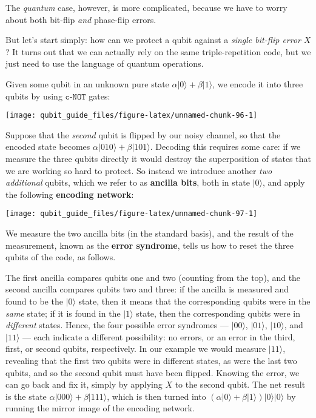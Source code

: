 \documentclass[fleqn]{article}
\begin{document}
The \emph{quantum} case, however, is more complicated, because we have to worry about both bit-flip \emph{and} phase-flip errors.

But let's start simply: how can we protect a qubit against a \emph{single bit-flip error} \(X\)?
It turns out that we can actually rely on the same triple-repetition code, but we just need to use the language of quantum operations.

Given some qubit in an unknown pure state \(\alpha|0\rangle + \beta|1\rangle\), we encode it into three qubits by using \(\texttt{c-NOT}\) gates:

\begin{center}\texttt{[image: qubit\_guide\_files/figure-latex/unnamed-chunk-96-1]} \end{center}

Suppose that the \emph{second} qubit is flipped by our noisy channel, so that the encoded state becomes \(\alpha|010\rangle + \beta|101\rangle\).
Decoding this requires some care: if we measure the three qubits directly it would destroy the superposition of states that we are working so hard to protect.
So instead we introduce another \emph{two additional} qubits, which we refer to as \textbf{ancilla bits}, both in state \(|0\rangle\), and apply the following \textbf{encoding network}:

\begin{center}\texttt{[image: qubit\_guide\_files/figure-latex/unnamed-chunk-97-1]} \end{center}

We measure the two ancilla bits (in the standard basis), and the result of the measurement, known as the \textbf{error syndrome}, tells us how to reset the three qubits of the code, as follows.

The first ancilla compares qubits one and two (counting from the top), and the second ancilla compares qubits two and three: if the ancilla is measured and found to be the \(|0\rangle\) state, then it means that the corresponding qubits were in the \emph{same} state; if it is found in the \(|1\rangle\) state, then the corresponding qubits were in \emph{different} states.
Hence, the four possible error syndromes --- \(|00\rangle\), \(|01\rangle\), \(|10\rangle\), and \(|11\rangle\) --- each indicate a different possibility: no errors, or an error in the third, first, or second qubits, respectively.
In our example we would measure \(|11\rangle\), revealing that the first two qubits were in different states, as were the last two qubits, and so the second qubit must have been flipped.
Knowing the error, we can go back and fix it, simply by applying \(X\) to the second qubit.
The net result is the state \(\alpha|000\rangle + \beta|111\rangle\), which is then turned into \((\alpha|0\rangle + \beta|1\rangle)|0\rangle|0\rangle\) by running the mirror image of the encoding network.
\end{document}
